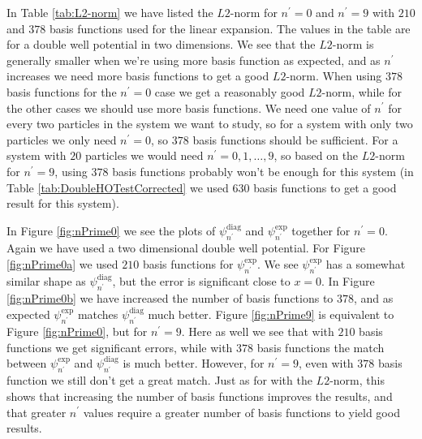 \documentclass[../main.tex]{subfiles}
\begin{document}
In Table \ref{tab:L2-norm} we have listed the $L2$-norm for $n^\prime = 0$ and $n^\prime = 9$ with $210$ and $378$ basis functions used for the linear expansion. The values in the table are for a double well potential in two dimensions. We see that the $L2$-norm is generally smaller when we're using more basis function as expected, and as $n^\prime$ increases we need more basis functions to get a good $L2$-norm. When using $378$ basis functions for the $n^\prime = 0$ case we get a reasonably good $L2$-norm, while for the other cases we should use more basis functions. We need one value of $n^\prime$ for every two particles in the system we want to study, so for a system with only two particles we only need $n^\prime = 0$, so $378$ basis functions should be sufficient. For a system with $20$ particles we would need $n^\prime = 0,1,\dots,9$, so based on the $L2$-norm for $n^\prime = 9$, using $378$ basis functions probably won't be enough for this system (in Table \ref{tab:DoubleHOTestCorrected} we used $630$ basis functions to get a good result for this system). 

In Figure \ref{fig:nPrime0} we see the plots of $\psi_{n^\prime}^\textrm{diag}$ and $\psi_{n^\prime}^\textrm{exp}$ together for $n^\prime = 0$. Again we have used a two dimensional double well potential. For Figure \ref{fig:nPrime0a} we used $210$ basis functions for $\psi_{n^\prime}^\textrm{exp}$. We see $\psi_{n^\prime}^\textrm{exp}$ has a somewhat similar shape as $\psi_{n^\prime}^\textrm{diag}$, but the error is significant close to $x = 0$. In Figure \ref{fig:nPrime0b} we have increased the number of basis functions to $378$, and as expected $\psi_{n^\prime}^\textrm{exp}$ matches $\psi_{n^\prime}^\textrm{diag}$ much better. Figure \ref{fig:nPrime9} is equivalent to Figure \ref{fig:nPrime0}, but for $n^\prime = 9$. Here as well we see that with $210$ basis functions we get significant errors, while with $378$ basis functions the match between $\psi_{n^\prime}^\textrm{exp}$ and $\psi_{n^\prime}^\textrm{diag}$ is much better. However, for $n^\prime = 9$, even with $378$ basis function we still don't get a great match. Just as for with the $L2$-norm, this shows that increasing the number of basis functions improves the results, and that greater $n^\prime$ values require a greater number of basis functions to yield good results.
\end{document}
